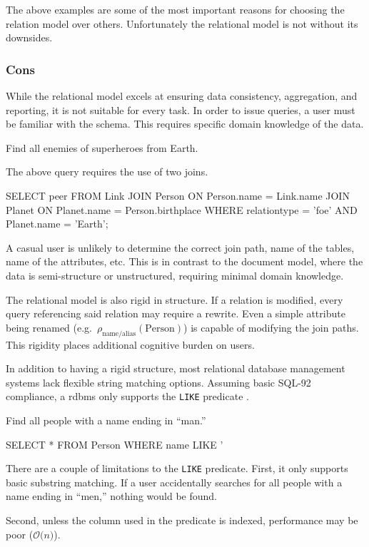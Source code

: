 			The above examples are some of the most important reasons for choosing the relation model over others.  Unfortunately the relational model is not without its downsides.
		
		\subsubsection{Cons}
			While the relational model excels at ensuring data consistency, aggregation, and reporting, it is not suitable for every task.  In order to issue queries, a user must be familiar with the schema.  This requires specific domain knowledge of the data.
			
			\begin{ex}
				Find all enemies of superheroes from Earth.
				
				The above query requires the use of two joins.
				
				\begin{singlespaced}
					\begin{sqlcode}
SELECT peer
FROM   Link
       JOIN Person
         ON Person.name = Link.name
       JOIN Planet
         ON Planet.name = Person.birthplace
WHERE  relationtype = 'foe'
       AND Planet.name = 'Earth';
					\end{sqlcode}
				\end{singlespaced}
			\end{ex}
			
			A casual user is unlikely to determine the correct join path, name of the tables, name of the attributes, etc.  This is in contrast to the document model, where the data is semi-structure or unstructured, requiring minimal domain knowledge.

			The relational model is also rigid in structure.  If a relation is modified, every query referencing said relation may require a rewrite.  Even a simple attribute being renamed (e.g.~$\rho_{\mathrm{name/alias}}(\mathrm{Person})$) is capable of modifying the join paths.  This rigidity places additional cognitive burden on users.
			
			In addition to having a rigid structure, most relational database management systems lack flexible string matching options.  Assuming basic SQL-92 compliance, a \gls{rdbms} only supports the \texttt{LIKE} predicate \cite{sql-2011}.
			
			\begin{ex}
				Find all people with a name ending in ``man.''
				
				\begin{singlespaced}
					\begin{sqlcode}
SELECT *
FROM   Person
WHERE  name LIKE '%
					\end{sqlcode}
				\end{singlespaced}
			\end{ex}
			
			There are a couple of limitations to the \texttt{LIKE} predicate.  First, it only supports basic substring matching.  If a user accidentally searches for all people with a name ending in ``men,'' nothing would be found.
			
			Second, unless the column used in the predicate is indexed, performance may be poor ($\mathcal{O}\bigl(n\bigr)$).